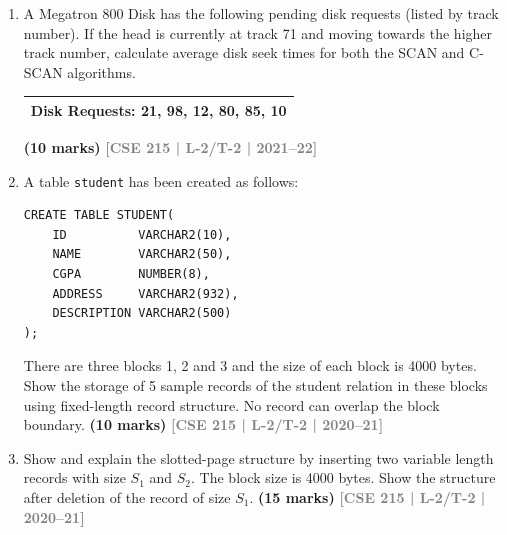 \documentclass[12pt]{article}
\newcommand{\yr}[1]{\hfill\textcolor{gray}{\small\textbf{[#1]}}}
\newcommand{\mk}[1]{\textcolor{orange!70!black}{\small\textbf{(#1 marks)}}}
\begin{document}
\begin{enumerate}
\item A Megatron 800 Disk has the following pending disk requests (listed by track number). If the head is currently at track 71 and moving towards the higher track number, calculate average disk seek times for both the SCAN and C-SCAN algorithms.
\medskip
\begin{center}
\begin{tabular}{l}
\toprule
\textbf{Disk Requests}: 21, 98, 12, 80, 85, 10\\
\bottomrule
\end{tabular}
\end{center}
\mk{10} \yr{CSE 215 | L-2/T-2 | 2021--22}


\item A table \texttt{student} has been created as follows:
\begin{lstlisting}
CREATE TABLE STUDENT(
    ID          VARCHAR2(10),
    NAME        VARCHAR2(50),
    CGPA        NUMBER(8),
    ADDRESS     VARCHAR2(932),
    DESCRIPTION VARCHAR2(500)
);
\end{lstlisting}
There are three blocks 1, 2 and 3 and the size of each block is 4000 bytes. Show the storage of 5 sample records of the student relation in these blocks using fixed-length record structure. No record can overlap the block boundary.
\mk{10} \yr{CSE 215 | L-2/T-2 | 2020--21}

 
\item Show and explain the slotted-page structure by inserting two variable length records with size $S_1$ and $S_2$. The block size is 4000 bytes. Show the structure after deletion of the record of size $S_1$.
\mk{15} \yr{CSE 215 | L-2/T-2 | 2020--21}



\end{enumerate}
\end{document}
